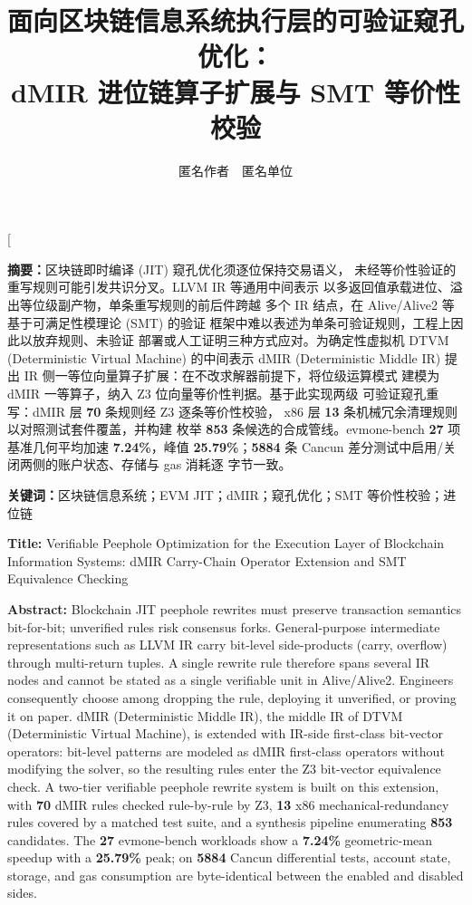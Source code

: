 \documentclass[10pt,a4paper,twocolumn]{article}
\title{\bfseries 面向区块链信息系统执行层的可验证窥孔优化：\\dMIR 进位链算子扩展与 SMT 等价性校验}
\author{匿名作者~~匿名单位}
\date{}
\begin{document}
\twocolumn[
\begin{@twocolumnfalse}
\maketitle
\begin{center}
\parbox{0.9\textwidth}{\small
\textbf{摘要：}区块链即时编译 (JIT) 窥孔优化须逐位保持交易语义，
未经等价性验证的重写规则可能引发共识分叉。LLVM IR 等通用中间表示
以多返回值承载进位、溢出等位级副产物，单条重写规则的前后件跨越
多个 IR 结点，在 Alive/Alive2 等基于可满足性模理论 (SMT) 的验证
框架中难以表述为单条可验证规则，工程上因此以放弃规则、未验证
部署或人工证明三种方式应对。为确定性虚拟机 DTVM (Deterministic
Virtual Machine) 的中间表示 dMIR (Deterministic Middle IR) 提出
IR 侧一等位向量算子扩展：在不改求解器前提下，将位级运算模式
建模为 dMIR 一等算子，纳入 Z3 位向量等价性判据。基于此实现两级
可验证窥孔重写：dMIR 层 \textbf{70} 条规则经 Z3 逐条等价性校验，
x86 层 \textbf{13} 条机械冗余清理规则以对照测试套件覆盖，并构建
枚举 \textbf{853} 条候选的合成管线。evmone-bench \textbf{27} 项
基准几何平均加速 \textbf{7.24\%}，峰值 \textbf{25.79\%}；\textbf{5884}
条 Cancun 差分测试中启用/关闭两侧的账户状态、存储与 gas 消耗逐
字节一致。
\vspace{0.3em}

\textbf{关键词：}区块链信息系统；EVM JIT；dMIR；窥孔优化；SMT 等价性校验；进位链
\vspace{0.8em}

\noindent\textbf{Title: }Verifiable Peephole Optimization for the Execution Layer of Blockchain Information Systems: dMIR Carry-Chain Operator Extension and SMT Equivalence Checking
\vspace{0.3em}

\noindent\textbf{Abstract: }Blockchain JIT peephole rewrites must preserve transaction semantics bit-for-bit; unverified rules risk consensus forks. General-purpose intermediate representations such as LLVM IR carry bit-level side-products (carry, overflow) through multi-return tuples. A single rewrite rule therefore spans several IR nodes and cannot be stated as a single verifiable unit in Alive/Alive2. Engineers consequently choose among dropping the rule, deploying it unverified, or proving it on paper. dMIR (Deterministic Middle IR), the middle IR of DTVM (Deterministic Virtual Machine), is extended with IR-side first-class bit-vector operators: bit-level patterns are modeled as dMIR first-class operators without modifying the solver, so the resulting rules enter the Z3 bit-vector equivalence check. A two-tier verifiable peephole rewrite system is built on this extension, with \textbf{70} dMIR rules checked rule-by-rule by Z3, \textbf{13} x86 mechanical-redundancy rules covered by a matched test suite, and a synthesis pipeline enumerating \textbf{853} candidates. The \textbf{27} evmone-bench workloads show a \textbf{7.24\%} geometric-mean speedup with a \textbf{25.79\%} peak; on \textbf{5884} Cancun differential tests, account state, storage, and gas consumption are byte-identical between the enabled and disabled sides.
\vspace{0.3em}

}
\end{center}
\end{@twocolumnfalse}
\end{document}
